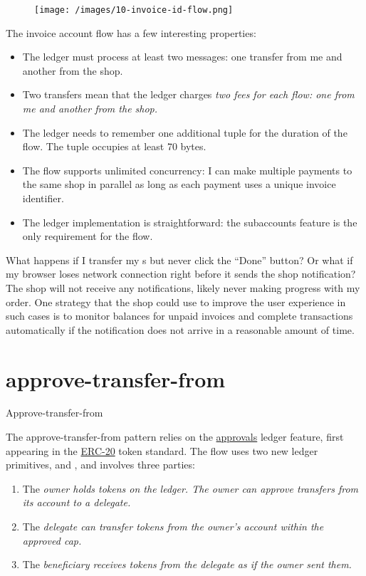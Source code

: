 \documentclass{article}
\begin{document}
\begin{figure}[grayscale-diagram]
\texttt{[image: /images/10-invoice-id-flow.png]}
\end{figure}

The invoice account flow has a few interesting properties:
\begin{itemize}
  \item The ledger must process at least two messages: one transfer from me and another from the shop.
  \item Two transfers mean that the ledger charges \em{two} fees for each flow: one from me and another from the shop.
  \item 
    The ledger needs to remember one additional  tuple for the duration of the flow.
    The tuple occupies at least 70 bytes.
  \item The flow supports unlimited concurrency: I can make multiple payments to the same shop in parallel as long as each payment uses a unique invoice identifier.
  \item 
    The ledger implementation is straightforward: the subaccounts feature is the only requirement for the flow.
\end{itemize}

What happens if I transfer my s but never click the ``Done'' button?
Or what if my browser loses network connection right before it sends the shop notification?
The shop will not receive any notifications, likely never making progress with my order.
One strategy that the shop could use to improve the user experience in such cases is to monitor balances for unpaid invoices and complete transactions automatically if the notification does not arrive in a reasonable amount of time.

\section{approve-transfer-from}{Approve-transfer-from}

The approve-transfer-from pattern relies on the \href{/posts/09-fungible-tokens-101.html#approvals}{approvals} ledger feature, first appearing in the \href{https://ethereum.org/en/developers/docs/standards/tokens/erc-20/}{ERC-20} token standard.
The flow uses two new ledger primitives,  and , and involves three parties:
\begin{enumerate}
  \item The \em{owner} holds tokens on the ledger. The owner can \em{approve} transfers from its account to a \em{delegate}.
  \item The \em{delegate} can \em{transfer} tokens \em{from} the owner's account within the approved cap.
  \item The \em{beneficiary} receives tokens from the delegate as if the owner sent them.
\end{enumerate}
\end{document}

